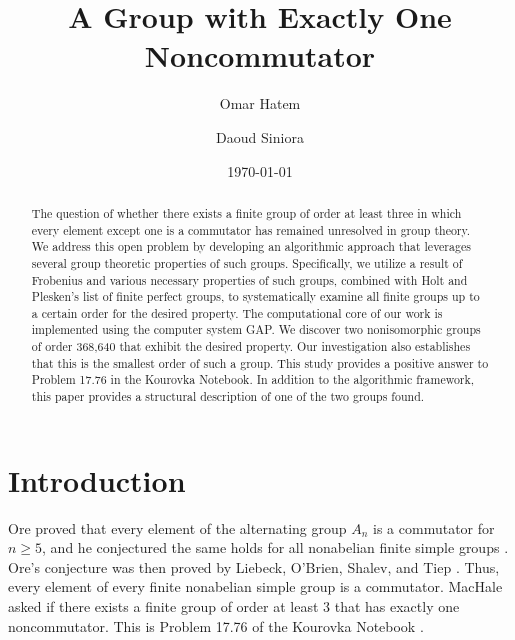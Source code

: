 \documentclass[10pt,leqno]{amsart}
\begin{document}
\title{A Group with Exactly One Noncommutator} %
\author{Omar Hatem}
\author{Daoud Siniora}
\date{\today}
\address{The American University in Cairo, P.O.Box 74, Cairo, Egypt}
\maketitle

\let\thefootnote\relax
{} %

\begin{abstract}
The question of whether there exists a finite group of order at least three in which every element except one is a commutator has remained unresolved in group theory. We address this open problem by developing an algorithmic approach that leverages several group theoretic properties of such groups. Specifically, we utilize a result of Frobenius and various necessary properties of such groups, combined with Holt and Plesken’s list of finite perfect groups, to systematically examine all finite groups up to a certain order for the desired property. The computational core of our work is implemented using the computer system GAP. We discover two nonisomorphic groups of order 368,640 that exhibit the desired property. Our investigation also establishes that this is the smallest order of such a group. This study provides a positive answer to Problem 17.76 in the Kourovka Notebook. In addition to the algorithmic framework, this paper provides a structural description of one of the two groups found. 
\end{abstract} %

\section{Introduction}

Ore proved that every element of the alternating group $A_n$ is a commutator for $n\geq 5$, and he conjectured the same holds for all nonabelian finite simple groups \cite{Ore1951}. Ore's conjecture was then proved by Liebeck, O'Brien, Shalev, and Tiep \cite{Liebeck2010}. Thus, every element of every finite nonabelian simple group is a commutator. MacHale asked if there exists a finite group of order at least 3 that has exactly one noncommutator. This is Problem 17.76 of the Kourovka Notebook \cite{khukhro2024unsolvedproblemsgrouptheory}. 
\end{document}
